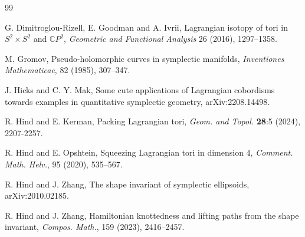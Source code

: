 \documentclass[12pt]{amsart}
\theoremstyle{definition}
\newcommand{\CC}{{\mathbb C}}
\begin{document}
\begin{thebibliography} {99}

 G. Dimitroglou-Rizell, E. Goodman and A. Ivrii, Lagrangian isotopy of tori in $S^2 \times S^2$ and $\CC P^2$, {\it Geometric and Functional Analysis} 26 (2016), 1297--1358.

 M. Gromov, Pseudo-holomorphic curves in symplectic manifolds, {\em Inventiones Mathematicae}, 82 (1985), 307--347.

 J. Hicks and C. Y. Mak, Some cute applications of Lagrangian cobordisms towards examples in quantitative symplectic geometry, arXiv:2208.14498.









 R. Hind and E. Kerman, Packing Lagrangian tori, {\it Geom. and Topol.} \textbf{28}:5 (2024), 2207-2257.

 R. Hind and E. Opshtein, Squeezing Lagrangian tori in dimension $4$, {\it Comment. Math. Helv.}, 95 (2020), 535--567.

 R. Hind and J. Zhang, The shape invariant of symplectic ellipsoids, arXiv:2010.02185.

 R. Hind and J. Zhang, Hamiltonian knottedness and lifting paths from the shape invariant, {\it Compos. Math.}, 159 (2023), 2416--2457.



\end{thebibliography}
\end{document}
